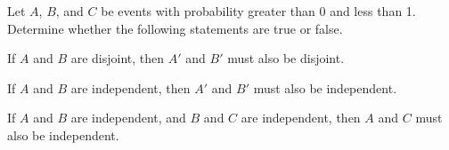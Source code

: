 \documentclass[a4paper, 10pt]{article}
\begin{document}
\begin{problem}
Let \(A\), \(B\), and \(C\) be events with probability greater than 0 and less than 1.
Determine whether the following statements are true or false.
\begin{subproblems}
    \item If \(A\) and \(B\) are disjoint, then \(A'\) and \(B'\) must also be disjoint.
    \item If \(A\) and \(B\) are independent, then \(A'\) and \(B'\) must also be independent.
    \item If \(A\) and \(B\) are independent, and \(B\) and \(C\) are independent, then \(A\) and \(C\) must also be independent.
\end{subproblems}
\end{problem}
\end{document}
